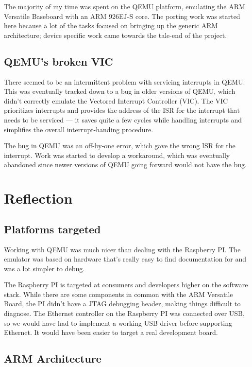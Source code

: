 \documentclass[12pt]{article}
\begin{document}
The majority of my time was spent on the QEMU platform, emulating the ARM
Versatile Baseboard with an ARM 926EJ-S core. The porting work was started here
because a lot of the tasks focused on bringing up the generic ARM architecture;
device specific work came towards the tale-end of the project.

\subsection{QEMU's broken VIC}

There seemed to be an intermittent problem with servicing interrupts in QEMU.
This was eventually tracked down to a bug in older versions of QEMU, which
didn't correctly emulate the Vectored Interrupt Controller (VIC). The VIC
prioritizes interrupts and provides the address of the ISR for the interrupt
that needs to be serviced \---- it saves quite a few cycles while handling
interrupts and simplifies the overall interrupt-handing procedure.

The bug in QEMU was an off-by-one error, which gave the wrong ISR for the
interrupt. Work was started to develop a workaround, which was eventually
abandoned since newer versions of QEMU going forward would not have the bug.

\section{Reflection}

\subsection{Platforms targeted}

Working with QEMU was much nicer than dealing with the Raspberry PI. The
emulator was based on hardware that's really easy to find documentation for and
was a lot simpler to debug.

The Raspberry PI is targeted at consumers and developers higher on the software
stack. While there are some components in common with the ARM Versatile Board,
the PI didn't have a JTAG debugging header, making things difficult to
diagnose. The Ethernet controller on the Raspberry PI was connected over USB,
so we would have had to implement a working USB driver before supporting
Ethernet. It would have been easier to target a real development board.

\subsection{ARM Architecture}
\end{document}
